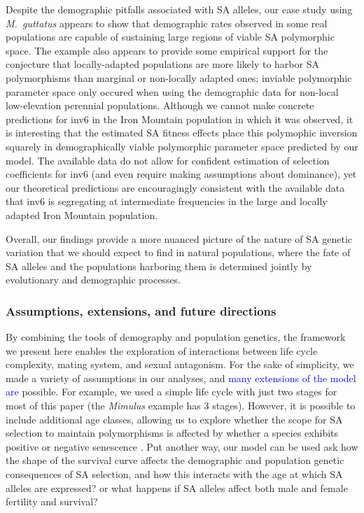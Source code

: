 \documentclass[11pt]{article}
\begin{document}
Despite the demographic pitfalls associated with SA alleles, our case study using {\itshape M.~guttatus} appears to show that demographic rates observed in some real populations are capable of sustaining large regions of viable SA polymorphic space. The example also appears to provide some empirical support for the conjecture that locally-adapted populations are more likely to harbor SA polymorphisms than marginal or non-locally adapted ones; inviable polymorphic parameter space only occured when using the demographic data for non-local low-elevation perennial populations. Although we cannot make concrete predictions for inv6 in the Iron Mountain population in which it was observed, it is interesting that the estimated SA fitness effects place this polymophic inversion squarely in demographically viable polymorphic parameter space predicted by our model. The available data do not allow for confident estimation of selection coefficients for inv6 (and even require making assumptions about dominance), yet our theoretical predictions are encouragingly consistent with the available data that inv6 is segregating at intermediate frequencies in the large and locally adapted Iron Mountain population. 

Overall, our findings provide a more nuanced picture of the nature of SA genetic variation that we should expect to find in natural populations, where the fate of SA alleles and the populations harboring them is determined jointly by evolutionary and demographic processes.



\subsubsection*{Assumptions, extensions, and future directions}\label{subsubsec:extensions}

By combining the tools of demography and population genetics, the framework we present here enables the exploration of interactions between life cycle complexity, mating system, and sexual antagonism. For the sake of simplicity, we made a variety of assumptions in our analyses, and \textcolor{blue}{many extensions of the model are} possible. For example, we used a simple life cycle with just two stages for most of this paper (the \textit{Mimulus} example has $3$ stages). However, it is possible to include additional age classes, allowing us to explore whether the scope for SA selection to maintain polymorphisms is affected by whether a species exhibits positive or negative senescence \citep{jones2014diversity}. Put another way, our model can be used ask how the shape of the survival curve affects the demographic and population genetic consequences of SA selection, and how this interacts with the age at which SA alleles are expressed? or what happens if SA alleles affect both male and female fertility and survival? 
\end{document}
